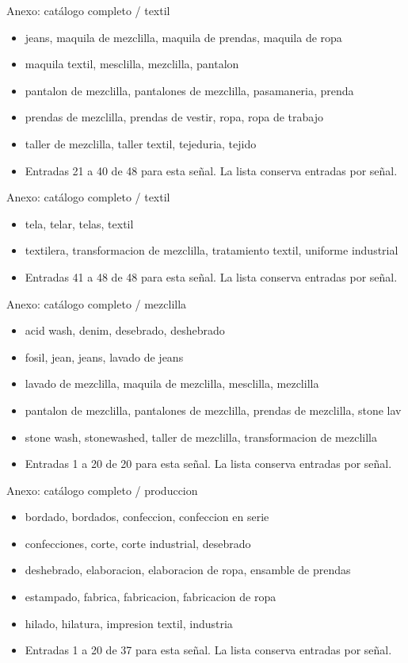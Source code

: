 \documentclass[aspectratio=169,10pt]{beamer}
\begin{document}
\begin{frame}{Anexo: catálogo completo / textil}
\small
\begin{itemize}
\item jeans, maquila de mezclilla, maquila de prendas, maquila de ropa
\item maquila textil, mesclilla, mezclilla, pantalon
\item pantalon de mezclilla, pantalones de mezclilla, pasamaneria, prenda
\item prendas de mezclilla, prendas de vestir, ropa, ropa de trabajo
\item taller de mezclilla, taller textil, tejeduria, tejido
\item Entradas 21 a 40 de 48 para esta señal. La lista conserva entradas por señal.
\end{itemize}
\end{frame}
\begin{frame}{Anexo: catálogo completo / textil}
\small
\begin{itemize}
\item tela, telar, telas, textil
\item textilera, transformacion de mezclilla, tratamiento textil, uniforme industrial
\item Entradas 41 a 48 de 48 para esta señal. La lista conserva entradas por señal.
\end{itemize}
\end{frame}
\begin{frame}{Anexo: catálogo completo / mezclilla}
\small
\begin{itemize}
\item acid wash, denim, desebrado, deshebrado
\item fosil, jean, jeans, lavado de jeans
\item lavado de mezclilla, maquila de mezclilla, mesclilla, mezclilla
\item pantalon de mezclilla, pantalones de mezclilla, prendas de mezclilla, stone lav
\item stone wash, stonewashed, taller de mezclilla, transformacion de mezclilla
\item Entradas 1 a 20 de 20 para esta señal. La lista conserva entradas por señal.
\end{itemize}
\end{frame}
\begin{frame}{Anexo: catálogo completo / produccion}
\small
\begin{itemize}
\item bordado, bordados, confeccion, confeccion en serie
\item confecciones, corte, corte industrial, desebrado
\item deshebrado, elaboracion, elaboracion de ropa, ensamble de prendas
\item estampado, fabrica, fabricacion, fabricacion de ropa
\item hilado, hilatura, impresion textil, industria
\item Entradas 1 a 20 de 37 para esta señal. La lista conserva entradas por señal.
\end{itemize}
\end{frame}
\end{document}

